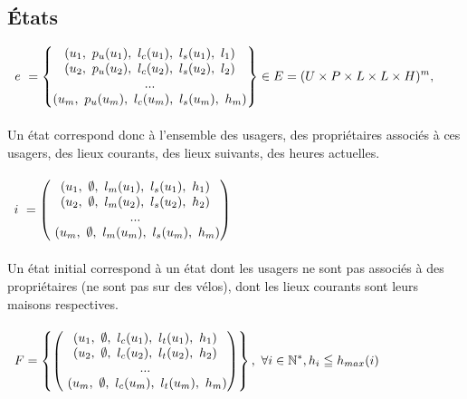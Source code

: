 \documentclass[french]{article}
\begin{document}
\newpage
\subsection{États}
\noindent
$\displaystyle  \begin{array}{{>{\displaystyle}l}}
e\ =\begin{Bmatrix}
( u_{1} ,\ p_{u}( u_{1}) ,\ l_{c}( u_{1}) ,\ l_{s}( u_{1}) ,\ l_{1})\\
( u_{2} ,\ p_{u}( u_{2}) ,\ l_{c}( u_{2}) ,\ l_{s}( u_{2}) ,\ l_{2})\\
...\\
( u_{m} ,\ p_{u}( u_{m}) ,\ l_{c}( u_{m}) ,\ l_{s}( u_{m}) ,\ h_{m})
\end{Bmatrix} \in E=( U\times P\times L\times L\times H)^{m} ,\\
\end{array}$\\
\\
Un état correspond donc à l'ensemble des usagers, des propriétaires associés à ces usagers, des lieux courants, des lieux suivants, des heures actuelles.\\
\vspace*{0.5cm}
\\
$\displaystyle  \begin{array}{{>{\displaystyle}l}}
i\ =\begin{pmatrix}
( u_{1} ,\ \emptyset ,\ l_{m}( u_{1}) ,\ l_{s}( u_{1}) ,\ h_{1})\\
( u_{2} ,\ \emptyset ,\ l_{m}( u_{2}) ,\ l_{s}( u_{2}) ,\ h_{2})\\
...\\
\ ( u_{m} ,\ \emptyset ,\ l_{m}( u_{m}) ,\ l_{s}( u_{m}) ,\ h_{m})
\end{pmatrix}\\
\end{array}$\\
\\
Un état initial correspond à un état dont les usagers ne sont pas associés à des propriétaires (ne sont pas sur des vélos), dont les lieux courants sont leurs maisons respectives.\\
\vspace*{0.5cm}
\\
$\displaystyle  \begin{array}{{>{\displaystyle}l}}
F=\begin{Bmatrix}
\begin{pmatrix}
( u_{1} ,\ \emptyset ,\ l_{c}( u_{1}) ,\ l_{t}( u_{1}) ,\ h_{1})\\
( u_{2} ,\ \emptyset ,\ l_{c}( u_{2}) ,\ l_{t}( u_{2}) ,\ h_{2})\\
...\\
\ ( u_{m} ,\ \emptyset ,\ l_{c}( u_{m}) ,\ l_{t}( u_{m}) ,\ h_{m})
\end{pmatrix}
\end{Bmatrix} ,\ \forall i\in \mathbb{N}^{*} ,h_{i} \leqq h_{max}( i)
\end{array}$\\
\end{document}
